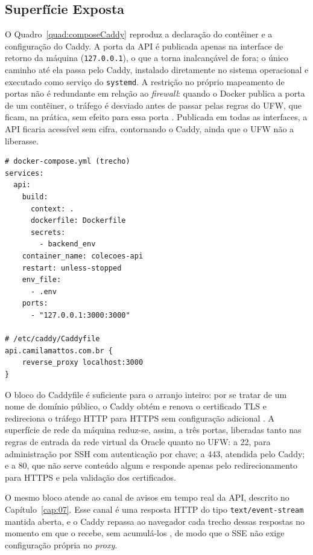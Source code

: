 \subsection{Superfície Exposta}

O Quadro~\ref{quad:composeCaddy} reproduz a declaração do contêiner e a configuração do Caddy. A porta da API é publicada apenas na interface de retorno da máquina (\texttt{127.0.0.1}), o que a torna inalcançável de fora; o único caminho até ela passa pelo Caddy, instalado diretamente no sistema operacional e executado como serviço do \texttt{systemd}. A restrição no próprio mapeamento de portas não é redundante em relação ao \textit{firewall}: quando o Docker publica a porta de um contêiner, o tráfego é desviado antes de passar pelas regras do UFW, que ficam, na prática, sem efeito para essa porta \cite{docker2026firewall}. Publicada em todas as interfaces, a API ficaria acessível sem cifra, contornando o Caddy, ainda que o UFW não a liberasse.

\FloatBarrier
\begin{quadro}[h!]
\caption{Declaração do contêiner da API e configuração do Caddy}
\label{quad:composeCaddy}
\centering
\begin{lstlisting}[numbers=none]
# docker-compose.yml (trecho)
services:
  api:
    build:
      context: .
      dockerfile: Dockerfile
      secrets:
        - backend_env
    container_name: colecoes-api
    restart: unless-stopped
    env_file:
      - .env
    ports:
      - "127.0.0.1:3000:3000"

# /etc/caddy/Caddyfile
api.camilamattos.com.br {
    reverse_proxy localhost:3000
}
\end{lstlisting}
\end{quadro}
\FloatBarrier

O bloco do Caddyfile é suficiente para o arranjo inteiro: por se tratar de um nome de domínio público, o Caddy obtém e renova o certificado TLS e redireciona o tráfego HTTP para HTTPS sem configuração adicional \cite{caddy2026https}. A superfície de rede da máquina reduz-se, assim, a três portas, liberadas tanto nas regras de entrada da rede virtual da Oracle quanto no UFW: a 22, para administração por SSH com autenticação por chave; a 443, atendida pelo Caddy; e a 80, que não serve conteúdo algum e responde apenas pelo redirecionamento para HTTPS e pela validação dos certificados.

O mesmo bloco atende ao canal de avisos em tempo real da API, descrito no Capítulo~\ref{cap:07}. Esse canal é uma resposta HTTP do tipo
\texttt{text/event-stream} mantida aberta, e o Caddy repassa ao navegador cada trecho dessas respostas no momento em que o recebe, sem acumulá-los
\cite{caddy2026proxy}, de modo que o SSE não exige configuração própria no \textit{proxy}.

